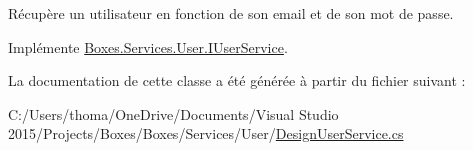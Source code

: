 Récupère un utilisateur en fonction de son email et de son mot de passe.  



Implémente \hyperlink{interface_boxes_1_1_services_1_1_user_1_1_i_user_service_af1d3d64ca48c7bf548203f6fa170f9d8}{Boxes.\+Services.\+User.\+I\+User\+Service}.



La documentation de cette classe a été générée à partir du fichier suivant \+:\begin{DoxyCompactItemize}
\item 
C\+:/\+Users/thoma/\+One\+Drive/\+Documents/\+Visual Studio 2015/\+Projects/\+Boxes/\+Boxes/\+Services/\+User/\hyperlink{_design_user_service_8cs}{Design\+User\+Service.\+cs}\end{DoxyCompactItemize}
